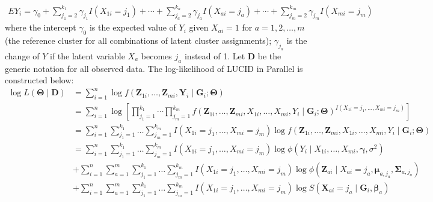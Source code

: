 \begin{equation}
    \begin{aligned}
E Y_{i}=\gamma_{0}+\sum_{j_{1}=2}^{k_{1}} \gamma_{j_{1}} I\left(X_{1 i}=j_{1}\right)+\cdots+\sum_{j_{a}=2}^{k_{a}} \gamma_{j_{a}} I\left(X_{a i}=j_{a}\right)+\cdots+\sum_{j_{m}=2}^{k_{m}} \gamma_{j_{m}} I\left(X_{m i}=j_{m}\right)
\end{aligned}
    \label{eq_24}
\end{equation}
where the intercept $\gamma_{0}$ is the expected value of $Y_{i}$ given $X_{a i}=1$ for $a=1,2,\ldots, m$ (the reference cluster for all combinations of latent cluster assignments); $\gamma_{j_{a}}$ is the change of $Y$ if the latent variable $X_{a}$ becomes $j_{a}$ instead of 1.
Let $\boldsymbol{D}$ be the generic notation for all observed data. The log-likelihood of LUCID in Parallel is constructed below:
\begin{equation}
   \begin{aligned}
\log L(\bm{\Theta}\mid \boldsymbol{D}) &  =\sum_{i=1}^{n} \log f\left(\boldsymbol{Z}_{1 i}, \ldots, \boldsymbol{Z}_{m i}, \boldsymbol{Y}_{i} \mid \boldsymbol{G}_{i} ; \boldsymbol{\Theta}\right) \\
& =\sum_{i=1}^{n} \log \left[\prod_{j_{1}=1}^{k_{1}} \cdots \prod_{j_{m}=1}^{k_{m}} f\left(\boldsymbol{Z}_{1 i}, \ldots, \boldsymbol{Z}_{m i}, X_{1 i}, \ldots, X_{m i}, Y_{i} \mid \boldsymbol{G}_{i} ; \boldsymbol{\Theta}\right)^{I\left(X_{1 i}=j_{1}, \ldots, X_{m i}=j_{m}\right)}\right] \\
& =\sum_{i=1}^{n} \sum_{j_{1}=1}^{k_{1}} \ldots \sum_{j_{m}=1}^{k_{m}} I\left(X_{1 i}=j_{1}, \ldots, X_{m i}=j_{m}\right) \log f\left(\boldsymbol{Z}_{1 i}, \ldots, \boldsymbol{Z}_{m i}, X_{1 i}, \ldots, X_{m i}, Y_{i} \mid \boldsymbol{G}_{i} ; \boldsymbol{\Theta}\right) \\
& =\sum_{i=1}^{n} \sum_{j_{1}=1}^{k_{1}} \ldots \sum_{j_{m}=1}^{k_{m}} I\left(X_{1 i}=j_{1}, \ldots, X_{m i}=j_{m}\right) \log \phi\left(Y_{i} \mid X_{1 i}, \ldots, X_{m i}, \boldsymbol{\gamma}, \sigma^{2}\right) \\
& +\sum_{i=1}^{n} \sum_{a=1}^{m} \sum_{j_{1}=1}^{k_{1}} \ldots \sum_{j_{m}=1}^{k_{m}} I\left(X_{1 i}=j_{1}, \ldots, X_{m i}=j_{m}\right) \log \phi\left(\boldsymbol{Z}_{a i} \mid X_{a i}=j_{a}, \boldsymbol{\mu}_{a,j_{a}}, \boldsymbol{\Sigma}_{a,j_{a}}\right) \\
& +\sum_{i=1}^{n} \sum_{a=1}^{m} \sum_{j_{1}=1}^{k_{1}} \ldots \sum_{j_{m}=1}^{k_{m}} I\left(X_{1 i}=j_{1}, \ldots, X_{m i}=j_{m}\right) \log S\left(\boldsymbol{X}_{a i}=j_{a} \mid \boldsymbol{G}_{i}, \boldsymbol{\beta}_{a}\right)
\end{aligned}
    \label{eq_26}
\end{equation}

